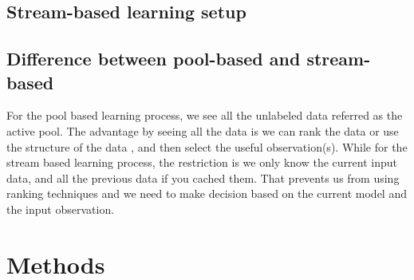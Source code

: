 \documentclass{article}
\begin{document}
\subsection{Stream-based learning setup}

\subsection{Difference between pool-based and stream-based}
For the pool based learning process, we see all the unlabeled data referred as the active pool. The advantage by seeing all the data is we can rank the data or use the structure of the data \cite{dasgupta2008hierarchical}, and then select the useful observation(s). 
While for the stream based learning process, the restriction is we only know the current input data, and all the previous data if you cached them. That prevents us from using ranking techniques and we need to make decision based on the current model and the input observation.

\section{Methods}

\end{document}
